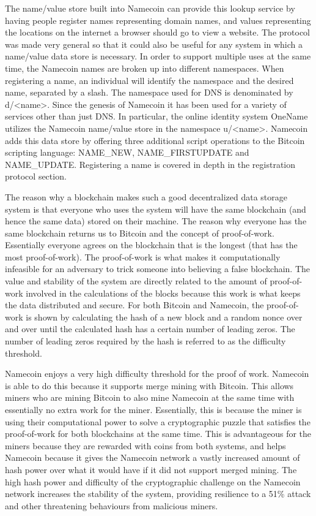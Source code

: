 The name/value store built into Namecoin can provide this lookup service by having people register names representing domain names, and values representing the locations on the internet a browser should go to view a website. The protocol was made very general so that it could also be useful for any system in which a name/value data store is necessary. In order to support multiple uses at the same time, the Namecoin names are broken up into different namespaces. When registering a name, an individual will identify the namespace and the desired name, separated by a slash. The namespace used for DNS is denominated by d/<name>. Since the genesis of Namecoin it has been used for a variety of services other than just DNS. In particular, the online identity system OneName utilizes the Namecoin name/value store in the namespace u/<name>. Namecoin adds this data store by offering three additional script operations to the Bitcoin scripting language: NAME\_NEW, NAME\_FIRSTUPDATE and NAME\_UPDATE. Registering a name is covered in depth in the registration protocol section. 

The reason  why a blockchain makes such a good decentralized data storage system is that everyone who uses the system will have the same blockchain (and hence the same data) stored on their machine. The reason why everyone has the same blockchain returns us to Bitcoin and the concept of proof-of-work. Essentially everyone agrees on the blockchain that is the longest (that has the most proof-of-work). The proof-of-work is what makes it computationally infeasible for an adversary to trick someone into believing a false blockchain. The value and stability of the system are directly related to the amount of proof-of-work involved in the calculations of the blocks because this work is what keeps the data distributed and secure. For both Bitcoin and Namecoin, the proof-of-work is shown by calculating the hash of a new block and a random nonce over and over until the calculated hash has a certain number of leading zeros. The number of leading zeros required by the hash is referred to as the difficulty threshold. 

Namecoin enjoys a very high difficulty threshold for the proof of work. Namecoin is able to do this because it supports merge mining with Bitcoin. This allows miners who are mining Bitcoin to also mine Namecoin at the same time with essentially no extra work for the miner. Essentially, this is because the miner is using their computational power to solve a cryptographic puzzle that satisfies the proof-of-work for both blockchains at the same time. This is advantageous for the miners because they are rewarded with coins from both systems, and helps Namecoin because it gives the Namecoin network a vastly increased amount of hash power over what it would have if it did not support merged mining. The high hash power and difficulty of the cryptographic challenge on the Namecoin network increases the stability of the system, providing resilience to a 51\% attack and other threatening behaviours from malicious miners. 


